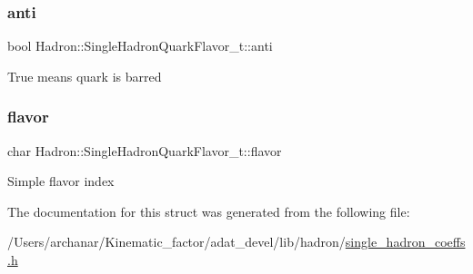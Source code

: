 \subsubsection{\texorpdfstring{anti}{anti}}
{\footnotesize\ttfamily bool Hadron\+::\+Single\+Hadron\+Quark\+Flavor\+\_\+t\+::anti}

True means quark is barred \mbox{\label{structHadron_1_1SingleHadronQuarkFlavor__t_a1a2a95305c9eb98e74a72c281a4cd36c}} 
\subsubsection{\texorpdfstring{flavor}{flavor}}
{\footnotesize\ttfamily char Hadron\+::\+Single\+Hadron\+Quark\+Flavor\+\_\+t\+::flavor}

Simple flavor index 

The documentation for this struct was generated from the following file\+:\begin{DoxyCompactItemize}
\item 
/\+Users/archanar/\+Kinematic\+\_\+factor/adat\+\_\+devel/lib/hadron/\mbox{\hyperlink{lib_2hadron_2single__hadron__coeffs_8h}{single\+\_\+hadron\+\_\+coeffs.\+h}}\end{DoxyCompactItemize}
